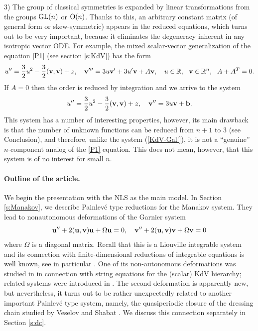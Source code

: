 \documentclass[11pt]{article}
\theoremstyle{plain}
\theoremstyle{definition}
\begin{document}
3) The group of classical symmetries is expanded by linear transformations from the groups ${\rm GL}(n)$ or ${\rm O}(n)$. Thanks to this, an arbitrary constant matrix (of general form or skew-symmetric) appears in the reduced equations, which turns out to be very important, because it eliminates the degeneracy inherent in any isotropic vector ODE. For example, the mixed scalar-vector generalization of the equation \ref{P1} (see section \ref{s:KdV}) has the form
\begin{equation}\label{KdV-Gal'}
 u''=\frac{3}{2}u^2-\frac{3}{2}({\bf v},{\bf v})+z,\quad 
 {\bf v}'''=3u{\bf v}'+3u'{\bf v}+A{\bf v},\quad 
 u\in{\mathbb R},~~ {\bf v}\in{\mathbb R}^n,~~ A+A^T=0.
\end{equation}
If $A=0$ then the order is reduced by integration and we arrive to the system
\[
 u''=\frac{3}{2}u^2-\frac{3}{2}({\bf v},{\bf v})+z,\quad {\bf v}''=3u{\bf v}+{\bf b}.
\]
This system has a number of interesting properties, however, its main drawback is that the number of unknown functions can be reduced from $n+1$ to 3 (see Conclusion), and therefore, unlike the system (\ref{KdV-Gal'}), it is not a ``genuine'' $n$-component analog of the \ref{P1} equation. This does not mean, however, that this system is of no interest for small $n$.

\paragraph{Outline of the article.} We begin the presentation with the NLS as the main model. In Section \ref{s:Manakov}, we describe Painlev\'e type reductions for the Manakov system. They lead to nonautonomous deformations of the Garnier system \cite{Garnier_1919} 
\begin{equation}\label{Garnier}
 {\bf u}''+2({\bf u},{\bf v}){\bf u}+\Omega {\bf u}=0,\quad {\bf v}''+2({\bf u},{\bf v}){\bf v}+\Omega {\bf v}=0
\end{equation}
where $\Omega$ is a diagonal matrix. Recall that this is a Liouville integrable system and its connection with finite-dimensional reductions of integrable equations is well known, see in particular \cite{Choodnovsky_1978, Antonowicz_Rauch-Wojciechowski_1990, Suris_2003}. One of its non-autonomous deformations was studied in \cite{Adler_Kolesnikov_2023, Domrin_Suleimanov_2025} in connection with string equations for the (scalar) KdV hierarchy; related systems were introduced in \cite{Orlov_Rauch-Wojciechowski_1993}. The second deformation is apparently new, but nevertheless, it turns out to be rather unexpectedly related to another important Painlev\'e type system, namely, the quasiperiodic closure of the dressing chain studied by Veselov and Shabat \cite{Veselov_Shabat_1993}. We discuss this connection separately in Section \ref{s:dc}.
\end{document}
